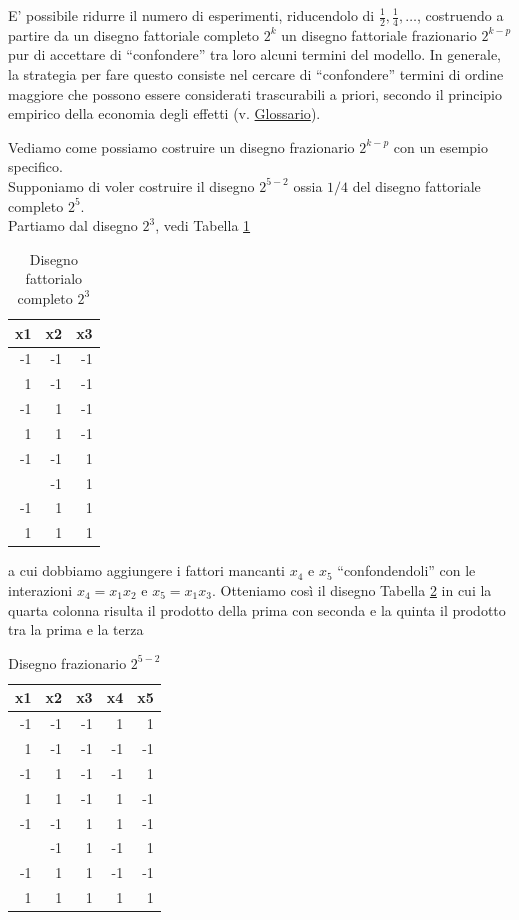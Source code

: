 \documentclass[
  11pt,
]{book}
\begin{document}
E' possibile ridurre il numero di esperimenti, riducendolo di \(\frac{1}{2},\frac{1}{4}, \dots\), costruendo a partire da un disegno fattoriale completo \(2^k\) un disegno fattoriale frazionario \(2^{k-p}\) pur di accettare di ``confondere'' tra loro alcuni termini del modello. In generale, la strategia per fare questo consiste nel cercare di ``confondere'' termini di ordine maggiore che possono essere considerati trascurabili a priori, secondo il principio empirico della economia degli effetti (v. \protect\hyperlink{glossario}{Glossario}).

Vediamo come possiamo costruire un disegno frazionario \(2^{k-p}\) con un esempio specifico.\\
Supponiamo di voler costruire il disegno \(2^{5-2}\) ossia \(1/4\) del disegno fattoriale completo \(2^5\).\\
Partiamo dal disegno \(2^3\), vedi Tabella \ref{tab:fatt3}

\begin{table}

\caption{\label{tab:fatt3}Disegno fattorialo completo $2^3$}
\centering
\begin{tabular}[t]{rrr}
\toprule
x1 & x2 & x3\\
\midrule
-1 & -1 & -1\\
1 & -1 & -1\\
-1 & 1 & -1\\
1 & 1 & -1\\
-1 & -1 & 1\\
\addlinespace
1 & -1 & 1\\
-1 & 1 & 1\\
1 & 1 & 1\\
\bottomrule
\end{tabular}
\end{table}

a cui dobbiamo aggiungere i fattori mancanti \(x_4\) e \(x_5\) ``confondendoli'' con le interazioni \(x_4=x_1x_2\) e \(x_5=x_1x_3\). Otteniamo così il disegno Tabella \ref{tab:fraz52} in cui la quarta colonna risulta il prodotto della prima con seconda e la quinta il prodotto tra la prima e la terza \newpage

\begin{table}

\caption{\label{tab:fraz52}Disegno frazionario $2^{5-2}$}
\centering
\begin{tabular}[t]{rrrrr}
\toprule
x1 & x2 & x3 & x4 & x5\\
\midrule
-1 & -1 & -1 & 1 & 1\\
1 & -1 & -1 & -1 & -1\\
-1 & 1 & -1 & -1 & 1\\
1 & 1 & -1 & 1 & -1\\
-1 & -1 & 1 & 1 & -1\\
\addlinespace
1 & -1 & 1 & -1 & 1\\
-1 & 1 & 1 & -1 & -1\\
1 & 1 & 1 & 1 & 1\\
\bottomrule
\end{tabular}
\end{table}
\end{document}
